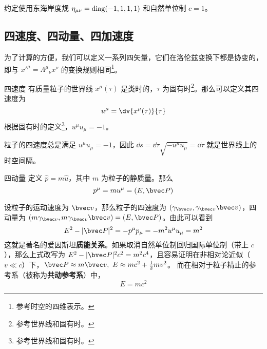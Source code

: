 

约定使用东海岸度规 $\eta_{\mu\nu}=\rm{diag}(-1,1,1,1)$ 和自然单位制 $c=1$。

\subsection{四速度、四动量、四加速度}
为了计算的方便，我们可以定义一系列四矢量，它们在洛伦兹变换下都是协变的，即与 $x'^\mu=\Lambda^\mu{}_\nu x^\nu$ 的变换规则相同\footnote{参考时空的四维表示。}。

\begin{definition}{四速度}
有质量粒子的世界线 $x^\mu(\tau)$ 是类时的，$\tau$ 为固有时\footnote{参考世界线和固有时。}。那么可以定义其四速度为
\begin{equation}
u^\mu = \dv{x^\mu(\tau)}{\tau}
\end{equation}
根据固有时的定义\footnote{参考世界线和固有时。}，$u^\mu u_\mu = -1$。
\end{definition}
粒子的四速度总是满足 $u^\mu u_\mu = -1$，因此 $\dd s = \dd \tau \sqrt{- u^\mu u_\mu} = \dd \tau$ 就是世界线上的时空间隔。

\begin{definition}{四动量}
定义 $\hat p=m\hat u$，其中 $m$ 为粒子的静质量。那么
\begin{equation}
p^\mu = m u^\mu = (E,\bvec P)
\end{equation}
\end{definition}
设粒子的运动速度为 $\bvec v$，那么粒子的四速度为 $(\gamma_{\bvec v},\gamma_{\bvec v}\bvec v)$，四动量为 $(m\gamma_{\bvec v}, m\gamma_{\bvec v} \bvec v)=(E,\bvec P)$。由此可以看到
\begin{equation}
E^2-|\bvec P|^2=-p^\mu p_\mu=-m^2 u^\mu u_\mu = m^2
\end{equation}
这就是著名的爱因斯坦\textbf{质能关系}。如果取消自然单位制回归国际单位制（带上 $c$），那么上式改写为 $E^2-|\bvec P|^2c^2=m^2c^4$，且容易证明在非相对论近似（$v\ll c$）下，$\bvec P\approx m\bvec v,\ E\approx mc^2+\frac{1}{2}mv^2$。
而在相对于粒子精止的参考系（被称为\textbf{共动参考系}）中，
\begin{equation}
E=mc^2
\end{equation}
